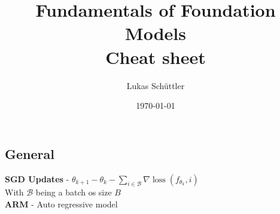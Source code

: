 

\title{Fundamentals of Foundation Models\\Cheat sheet}
\author{Lukas Schüttler}
\date{\today}
\pagestyle{empty}


\maketitle
\thispagestyle{empty}
\begin{multicols}{2}
    \section{General}
    \begin{mdframed}[style=eqbox]
        \textbf{SGD Updates} - $\theta_{k+1} - \theta_{k} - \sum_{i \in \mathcal{B}} \nabla \operatorname{loss}(f_{\theta_k}, i)$\\
        {\tiny With $\mathcal{B}$ being a batch os size $B$}\\
        \textbf{ARM} - Auto regressive model
    \end{mdframed}

\end{multicols}
